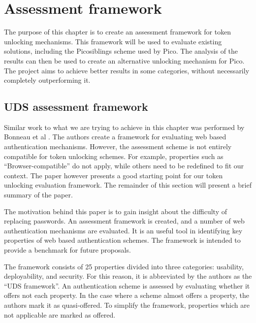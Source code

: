 
\chapter{Assessment framework}

\label{Chapter5}


The purpose of this chapter is to create an assessment framework for token unlocking mechanisms. This framework will be used to evaluate existing solutions, including the Picosiblings scheme used by Pico. The analysis of the results can then be used to create an alternative unlocking mechanism for Pico. The project aims to achieve better results in some categories, without necessarily completely outperforming it.

\section{UDS assessment framework}

Similar work to what we are trying to achieve in this chapter was performed by Bonneau et al \cite{bonneau2012quest}. The authors create a framework for evaluating web based authentication mechanisms. However, the assessment scheme is not entirely compatible for token unlocking schemes. For example, properties such as ``Browser-compatible'' do not apply, while others need to be redefined to fit our context.  The paper however presents a good starting point for our token unlocking evaluation framework. The remainder of this section will present a brief summary of the paper.

The motivation behind this paper is to gain insight about the difficulty of replacing passwords. An assessment framework is created, and a number of web authentication mechanisms are evaluated. It is an useful tool in identifying key properties of web based authentication schemes. The framework is intended to provide a benchmark for future proposals.

The framework consists of 25 properties divided into three categories: usability, deployability, and security. For this reason, it is abbreviated by the authors as the ``UDS framework''. An authentication scheme is assessed by evaluating whether it offers not each property. In the case where a scheme almost offers a property, the authors mark it as quasi-offered. To simplify the framework, properties which are not applicable are marked as offered.

